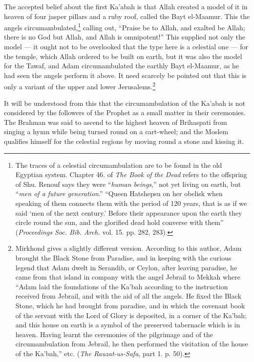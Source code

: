 \documentclass[a4paper, 11pt, oneside, polutonikogreek, english]{article}
\begin{document}
The accepted belief about the first Ka'abah is that Allah created a model of it in heaven of four jasper pillars and a ruby roof, called the Bayt el-Maamur. This the angels circumambulated,\footnote{The traces of a celestial circumambulation are to be found in the old Egyptian system. Chapter 46. of \emph{The Book of the Dead} refers to the offspring of Shu. Renouf says they were ``\emph{human beings},'' not yet living on earth, but ``\emph{men of a future generation}.'' ``Queen Hatshepsu on her obelisk when speaking of them connects them with the period of 120 years, that is as if we said `men of the next century.' Before their appearance upon the earth they circle round the sun, and the glorified dead hold converse with them'' (\emph{Proceedings Soc. Bib. Arch.} vol. 15. pp. 282, 283).} calling out, ``Praise be to Allah, and exalted be Allah; there is no God but Allah, and Allah is omnipotent!'' This supplied not only the model --- it ought not to be overlooked that the type here is a celestial one --- for the temple, which Allah ordered to be built on earth, but it was also the model for the Tawaf, and Adam circumambulated the earthly Bayt el-Maamur, as he had seen the angels perform it above. It need scarcely be pointed out that this is only a variant of the upper and lower Jerusalems.\footnote{Mirkhond gives a slightly different version. According to this author, Adam brought the Black Stone from Paradise, and in keeping with the curious legend that Adam dwelt in Serandib, or Ceylon, after leaving paradise, he came from that island in company with the angel Jebrail to Mekkah where ``Adam laid the foundations of the Ka'bah according to the instruction received from Jebrail, and with the aid of all the angels. He fixed the Black Stone, which he had brought from paradise, and in which the covenant book of the servant with the Lord of Glory is deposited, in a corner of the Ka'bah; and this house on earth is a symbol of the preserved tabernacle which is in heaven. Having learnt the ceremonies of the pilgrimage and of the circumambulation from Jebrail, he then performed the visitation of the house of the Ka'bah,'' etc. (\emph{The Rauzat-us-Safa}, part 1. p. 50).}

It will be understood from this that the circumambulation of the Ka'abah is not considered by the followers of the Prophet as a small matter in their ceremonies. The Brahman was said to ascend to the highest heaven of Brihaspati from singing a hymn while being turned round on a cart-wheel; and the Moslem qualifies himself for the celestial regions by moving round a stone and kissing it.
\end{document}
